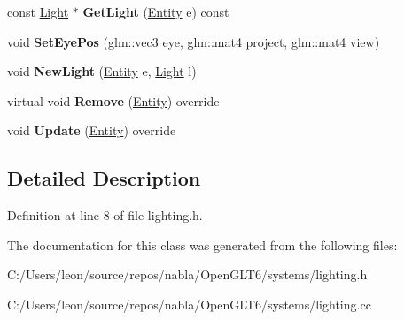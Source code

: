 \begin{DoxyCompactItemize}
\item 
\mbox{\label{classnabla_1_1_lighting_system_ad677e895507d2c76470069972dcb94c1}} 
const \mbox{\hyperlink{structnabla_1_1_lighting_system_1_1_light}{Light}} $\ast$ {\bfseries Get\+Light} (\mbox{\hyperlink{structnabla_1_1_entity}{Entity}} e) const
\item 
\mbox{\label{classnabla_1_1_lighting_system_a76dd436253153075ad335dfd2cd8877d}} 
void {\bfseries Set\+Eye\+Pos} (glm\+::vec3 eye, glm\+::mat4 project, glm\+::mat4 view)
\item 
\mbox{\label{classnabla_1_1_lighting_system_a88831f23c8aa3542830635552624585a}} 
void {\bfseries New\+Light} (\mbox{\hyperlink{structnabla_1_1_entity}{Entity}} e, \mbox{\hyperlink{structnabla_1_1_lighting_system_1_1_light}{Light}} l)
\item 
\mbox{\label{classnabla_1_1_lighting_system_aca10a12115a021888cdcb6d3e31a9e8b}} 
virtual void {\bfseries Remove} (\mbox{\hyperlink{structnabla_1_1_entity}{Entity}}) override
\item 
\mbox{\label{classnabla_1_1_lighting_system_a01c4592ba9bd0299a5c1208bea2671f1}} 
void {\bfseries Update} (\mbox{\hyperlink{structnabla_1_1_entity}{Entity}}) override
\end{DoxyCompactItemize}


\subsection{Detailed Description}


Definition at line 8 of file lighting.\+h.



The documentation for this class was generated from the following files\+:\begin{DoxyCompactItemize}
\item 
C\+:/\+Users/leon/source/repos/nabla/\+Open\+G\+L\+T6/systems/lighting.\+h\item 
C\+:/\+Users/leon/source/repos/nabla/\+Open\+G\+L\+T6/systems/lighting.\+cc\end{DoxyCompactItemize}
